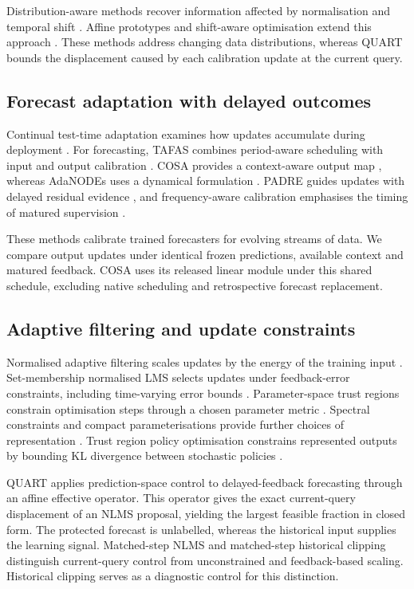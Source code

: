 \documentclass[preprint,12pt,times,nonatbib]{elsarticle}
\begin{document}
Distribution-aware methods recover information affected by normalisation and temporal shift \parencite{liu2022nonstationary,fan2023dishts,chen2024calibration,he2025robust}. Affine prototypes and shift-aware optimisation extend this approach \parencite{apt2026,adamshift2026}. These methods address changing data distributions, whereas QUART bounds the displacement caused by each calibration update at the current query.

\subsection{Forecast adaptation with delayed outcomes}
Continual test-time adaptation examines how updates accumulate during deployment \parencite{wang2022continualtta}. For forecasting, TAFAS combines period-aware scheduling with input and output calibration \parencite{kim2025tta}. COSA provides a context-aware output map \parencite{im2026cosa}, whereas AdaNODEs uses a dynamical formulation \parencite{adanodes2026}. PADRE guides updates with delayed residual evidence \parencite{li2026padre}, and frequency-aware calibration emphasises the timing of matured supervision \parencite{wang2026fac}.

These methods calibrate trained forecasters for evolving streams of data. We compare output updates under identical frozen predictions, available context and matured feedback. COSA uses its released linear module under this shared schedule, excluding native scheduling and retrospective forecast replacement.

\subsection{Adaptive filtering and update constraints}
Normalised adaptive filtering scales updates by the energy of the training input \parencite{nagumo1967}. Set-membership normalised LMS selects updates under feedback-error constraints, including time-varying error bounds \parencite{gollamudi1998setmembership,delamare2009setmembership}. Parameter-space trust regions constrain optimisation steps through a chosen parameter metric \parencite{more1983trustregion}. Spectral constraints and compact parameterisations provide further choices of representation \parencite{miyato2018spectral,hu2021lora,ding2023peft}. Trust region policy optimisation constrains represented outputs by bounding KL divergence between stochastic policies \parencite{schulman2015trpo}.

QUART applies prediction-space control to delayed-feedback forecasting through an affine effective operator. This operator gives the exact current-query displacement of an NLMS proposal, yielding the largest feasible fraction in closed form. The protected forecast is unlabelled, whereas the historical input supplies the learning signal. Matched-step NLMS and matched-step historical clipping distinguish current-query control from unconstrained and feedback-based scaling. Historical clipping serves as a diagnostic control for this distinction.
\end{document}
